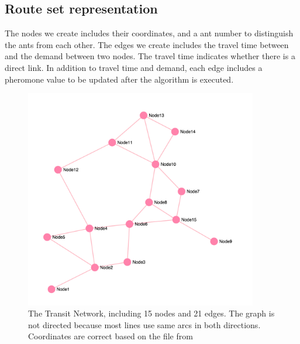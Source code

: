 \subsection{Route set representation}

The nodes we create includes their coordinates, and a ant number to distinguish the ants from each other. 
The edges we create includes the travel time between and the demand between two nodes. 
The travel time indicates whether there is a direct link. %
In addition to travel time and demand, each edge includes a pheromone value to be updated after the algorithm is executed.

\begin{figure}[hb]
  \centering
  \includegraphics[width=4in]{assets/mandlnetwork.png}
  \caption[Transit Network]
   {The Transit Network, including 15 nodes and 21 edges. The graph is not directed because most lines use same arcs in both directions. Coordinates are correct based on the file from \citep{fan09}}
\end{figure}
